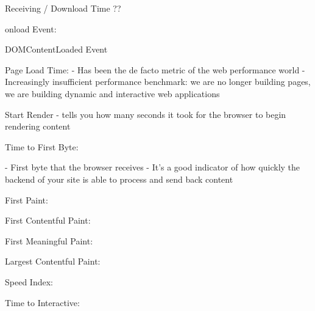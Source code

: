 Receiving / Download Time ?? %




onload Event: %


DOMContentLoaded Event %




Page Load Time: %
- Has been the de facto metric of the web performance world
- Increasingly insufficient performance benchmark: we are no longer building pages, we are building dynamic and interactive web applications




Start Render %
- tells you how many seconds it took for the browser to begin rendering content


Time to First Byte: %

- First byte that the browser receives
- It’s a good indicator of how quickly the backend of your site is able to process and send back content








First Paint: %


First Contentful Paint: %


First Meaningful Paint: %


Largest Contentful Paint: %


Speed Index: %


Time to Interactive: %













